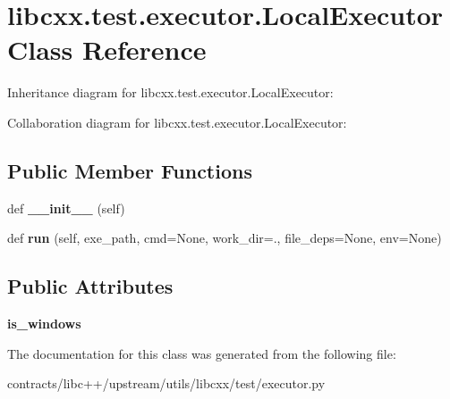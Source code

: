 \hypertarget{classlibcxx_1_1test_1_1executor_1_1_local_executor}{}\section{libcxx.\+test.\+executor.\+Local\+Executor Class Reference}
\label{classlibcxx_1_1test_1_1executor_1_1_local_executor}


Inheritance diagram for libcxx.\+test.\+executor.\+Local\+Executor\+:


Collaboration diagram for libcxx.\+test.\+executor.\+Local\+Executor\+:
\subsection*{Public Member Functions}
\begin{DoxyCompactItemize}
\item 
\mbox{\label{classlibcxx_1_1test_1_1executor_1_1_local_executor_a148606b6b0b1e355a1ead33d0a1fb094}} 
def {\bfseries \+\_\+\+\_\+init\+\_\+\+\_\+} (self)
\item 
\mbox{\label{classlibcxx_1_1test_1_1executor_1_1_local_executor_af43d43edfb63265619eea1438c82b38c}} 
def {\bfseries run} (self, exe\+\_\+path, cmd=None, work\+\_\+dir=\textquotesingle{}.\textquotesingle{}, file\+\_\+deps=None, env=None)
\end{DoxyCompactItemize}
\subsection*{Public Attributes}
\begin{DoxyCompactItemize}
\item 
\mbox{\label{classlibcxx_1_1test_1_1executor_1_1_local_executor_a84f59bd971fc82eda774e10db54a1e88}} 
{\bfseries is\+\_\+windows}
\end{DoxyCompactItemize}


The documentation for this class was generated from the following file\+:\begin{DoxyCompactItemize}
\item 
contracts/libc++/upstream/utils/libcxx/test/executor.\+py\end{DoxyCompactItemize}
